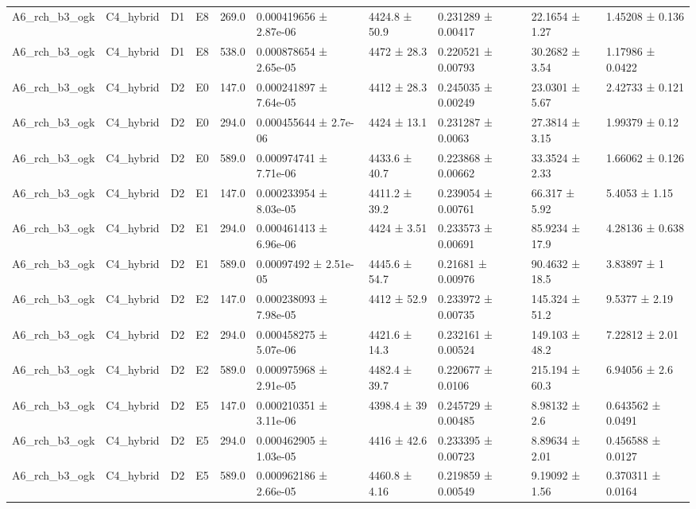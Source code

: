 \begin{table}
\begin{tabular}{llllllllll}
A6\_rch\_b3\_ogk & C4\_hybrid & D1 & E8 & 269.0 & 0.000419656 ± 2.87e-06 & 4424.8 ± 50.9 & 0.231289 ± 0.00417 & 22.1654 ± 1.27 & 1.45208 ± 0.136 \\
A6\_rch\_b3\_ogk & C4\_hybrid & D1 & E8 & 538.0 & 0.000878654 ± 2.65e-05 & 4472 ± 28.3 & 0.220521 ± 0.00793 & 30.2682 ± 3.54 & 1.17986 ± 0.0422 \\
A6\_rch\_b3\_ogk & C4\_hybrid & D2 & E0 & 147.0 & 0.000241897 ± 7.64e-05 & 4412 ± 28.3 & 0.245035 ± 0.00249 & 23.0301 ± 5.67 & 2.42733 ± 0.121 \\
A6\_rch\_b3\_ogk & C4\_hybrid & D2 & E0 & 294.0 & 0.000455644 ± 2.7e-06 & 4424 ± 13.1 & 0.231287 ± 0.0063 & 27.3814 ± 3.15 & 1.99379 ± 0.12 \\
A6\_rch\_b3\_ogk & C4\_hybrid & D2 & E0 & 589.0 & 0.000974741 ± 7.71e-06 & 4433.6 ± 40.7 & 0.223868 ± 0.00662 & 33.3524 ± 2.33 & 1.66062 ± 0.126 \\
A6\_rch\_b3\_ogk & C4\_hybrid & D2 & E1 & 147.0 & 0.000233954 ± 8.03e-05 & 4411.2 ± 39.2 & 0.239054 ± 0.00761 & 66.317 ± 5.92 & 5.4053 ± 1.15 \\
A6\_rch\_b3\_ogk & C4\_hybrid & D2 & E1 & 294.0 & 0.000461413 ± 6.96e-06 & 4424 ± 3.51 & 0.233573 ± 0.00691 & 85.9234 ± 17.9 & 4.28136 ± 0.638 \\
A6\_rch\_b3\_ogk & C4\_hybrid & D2 & E1 & 589.0 & 0.00097492 ± 2.51e-05 & 4445.6 ± 54.7 & 0.21681 ± 0.00976 & 90.4632 ± 18.5 & 3.83897 ± 1 \\
A6\_rch\_b3\_ogk & C4\_hybrid & D2 & E2 & 147.0 & 0.000238093 ± 7.98e-05 & 4412 ± 52.9 & 0.233972 ± 0.00735 & 145.324 ± 51.2 & 9.5377 ± 2.19 \\
A6\_rch\_b3\_ogk & C4\_hybrid & D2 & E2 & 294.0 & 0.000458275 ± 5.07e-06 & 4421.6 ± 14.3 & 0.232161 ± 0.00524 & 149.103 ± 48.2 & 7.22812 ± 2.01 \\
A6\_rch\_b3\_ogk & C4\_hybrid & D2 & E2 & 589.0 & 0.000975968 ± 2.91e-05 & 4482.4 ± 39.7 & 0.220677 ± 0.0106 & 215.194 ± 60.3 & 6.94056 ± 2.6 \\
A6\_rch\_b3\_ogk & C4\_hybrid & D2 & E5 & 147.0 & 0.000210351 ± 3.11e-06 & 4398.4 ± 39 & 0.245729 ± 0.00485 & 8.98132 ± 2.6 & 0.643562 ± 0.0491 \\
A6\_rch\_b3\_ogk & C4\_hybrid & D2 & E5 & 294.0 & 0.000462905 ± 1.03e-05 & 4416 ± 42.6 & 0.233395 ± 0.00723 & 8.89634 ± 2.01 & 0.456588 ± 0.0127 \\
A6\_rch\_b3\_ogk & C4\_hybrid & D2 & E5 & 589.0 & 0.000962186 ± 2.66e-05 & 4460.8 ± 4.16 & 0.219859 ± 0.00549 & 9.19092 ± 1.56 & 0.370311 ± 0.0164 \\

\end{tabular}
\end{table}
